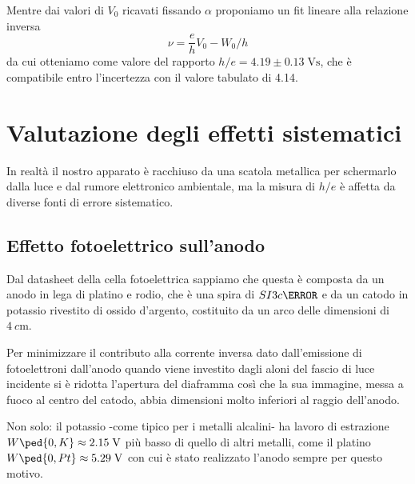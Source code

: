 \documentclass[10pt, a4paper, italian]{article}
\begin{document}
Mentre dai valori di $V_{0}$ ricavati fissando $\alpha$ proponiamo un fit
lineare alla relazione inversa
\begin{equation}
\nu = \frac{e}{h} V_{0} - W_{0}/h
\end{equation}
da cui otteniamo come valore del rapporto $h/e = 4.19 \pm 0.13 \; \si{\V \s}$,
che è compatibile entro l'incertezza con il valore tabulato di 4.14.

\section{Valutazione degli effetti sistematici}
In realtà il nostro apparato è racchiuso da una scatola metallica per
schermarlo dalla luce e dal rumore elettronico ambientale, ma la misura
di $h/e$ è affetta da diverse fonti di errore sistematico.

\subsection{Effetto fotoelettrico sull'anodo}
Dal datasheet della cella fotoelettrica sappiamo che questa è composta da un
anodo in lega di platino e rodio, che è una spira di $SI{3}{c\meter}$ e da un
catodo in potassio rivestito di ossido d'argento, costituito da un arco
delle dimensioni di $\SI{4}{c\meter}$.

Per minimizzare il contributo alla corrente inversa dato dall'emissione di
fotoelettroni dall'anodo quando viene investito dagli aloni del fascio di
luce incidente si è ridotta l'apertura del diaframma così che la sua
immagine, messa a fuoco al centro del catodo, abbia dimensioni molto
inferiori al raggio dell'anodo.

Non solo: il potassio -come tipico per i metalli alcalini- ha lavoro di
estrazione $W\ped{0, K} \approx 2.15 \; \si{\V}$ più basso di quello di altri
metalli, come il platino $W\ped{0, Pt} \approx 5.29 \; \si{\V}$ con cui è
stato realizzato l'anodo sempre per questo motivo.
\end{document}
